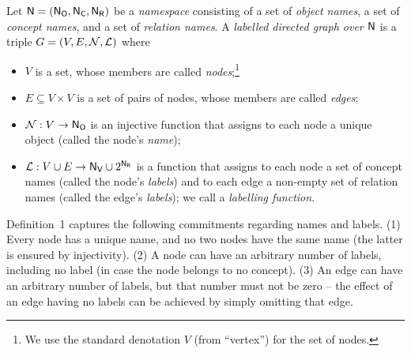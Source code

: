 %
\begin{definition}
  \label{def:ld_graph}
  Let $\textup{\textsf{N}}=(\mathsf{N}_\mathsf{O},\mathsf{N}_\mathsf{C},\mathsf{N}_\mathsf{R})$ be a \emph{namespace} consisting of a set \NO of \emph{object names}, a set \NC of \emph{concept names}, and a set \NR of \emph{relation names}.
  A \emph{labelled directed graph over $\textup{\textsf{N}}$} is a triple $G = (V,E,\mathcal{N},\mathcal{L})$
  where
  \begin{itemize}
    \item
      $V$ is a set, whose members are called \emph{nodes};\footnote{%
        We use the standard denotation $V$ (from \enquote{vertex}) for the set of nodes.%
      }      
    \item 
      $E \subseteq V \times V$ is a set of pairs of nodes, whose members are called \emph{edges};
    \item
      $\mathcal{N} : V \to \mathsf{N}_\mathsf{O}$ is an injective function that assigns
      to each node a unique object (called the node's \emph{name});
    \item
      $\mathcal{L} : V \cup E \to \mathsf{N}_\mathsf{V} \cup 2^{\mathsf{N}_\mathsf{R}}$ is a function that assigns 
      to each node a set of concept names (called the node's \emph{labels}) and
      to each edge a non-empty set of relation names (called the edge's \emph{labels});
      we call \Lmc a \emph{labelling function}.
  \end{itemize}
\end{definition}
%
Definition~1 captures the following commitments regarding names and labels.
%
(1) Every node has a unique name, and no two nodes have the same name (the latter is ensured by injectivity).
(2) A node can have an arbitrary number of labels, including no label (in case the node belongs to no concept).
(3) An edge can have an arbitrary number of labels, but that number must not be zero --
the effect of an edge having no labels can be achieved by simply omitting that edge.

